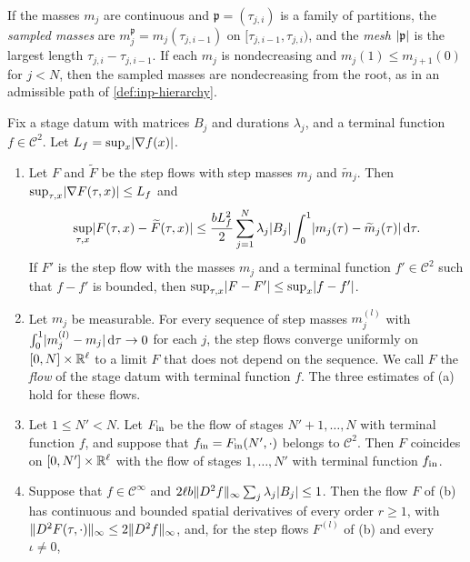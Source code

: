 If the masses $m_j$ are continuous and $\mathfrak p=(\tau_{j,i})$ is a family of
partitions, the \emph{sampled masses} are $m_j^{\mathfrak p}=m_j(\tau_{j,i-1})$
on $[\tau_{j,i-1},\tau_{j,i})$, and the \emph{mesh} $\lvert \mathfrak p\rvert$ is the
largest length $\tau_{j,i}-\tau_{j,i-1}$. If each $m_j$ is nondecreasing and
$m_j(1)\le m_{j+1}(0)$ for $j<N$, then the sampled masses are nondecreasing from
the root, as in an admissible path of \cref{def:inp-hierarchy}.

\begin{lemma}\label{lem:flow-step-limit}
Fix a stage datum with matrices $B_j$ and durations $\lambda_j$, and a terminal
function $f\in\mathcal C^2$. Let $L_f=\sup_x\lvert \nabla f(x)\rvert$.
\begin{enumerate}[label=\textup{(\alph*)}]
\item Let $F$ and $\widetilde F$ be the step flows with step masses $m_j$ and
 $\widetilde m_j$. Then $\sup_{\tau,x}\lvert \nabla F(\tau,x)\rvert\le L_f$ and
 \begin{equation}\label{eq:flow-L1}
  \sup_{\tau,x}\lvert F(\tau,x)-\widetilde F(\tau,x)\rvert
  \le\frac{bL_f^2}{2}\sum_{j=1}^N\lambda_j\lvert B_j\rvert
  \int_0^1\lvert m_j(\tau)-\widetilde m_j(\tau)\rvert\,\mathrm d\tau.
 \end{equation}
 If $F'$ is the step flow with the masses $m_j$ and a terminal function
 $f'\in\mathcal C^2$ such that $f-f'$ is bounded, then
 $\sup_{\tau,x}\lvert F-F'\rvert\le\sup_x\lvert f-f'\rvert$.
\item Let $m_j$ be measurable. For every sequence of step masses $m_j^{(l)}$ with
 $\int_0^1\lvert m_j^{(l)}-m_j\rvert\,\mathrm d\tau\to0$ for each $j$, the step flows converge
 uniformly on $[0,N]\times\mathbb R^\ell$ to a limit $F$ that does not depend on the
 sequence. We call $F$ the \emph{flow} of the stage datum with terminal
 function $f$. The three estimates of \textup{(a)} hold for these flows.
\item Let $1\le N'<N$. Let $F_{\rm in}$ be the flow of stages $N'+1,\dots,N$
 with terminal function $f$, and suppose that $f_{\rm in}=F_{\rm in}(N',\cdot)$
 belongs to $\mathcal C^2$. Then $F$ coincides on $[0,N']\times\mathbb R^\ell$ with the
 flow of stages $1,\dots,N'$ with terminal function $f_{\rm in}$.
\item Suppose that $f\in\mathcal C^\infty$ and
 $2\ell b\lVert D^2f\rVert_\infty\sum_j\lambda_j\lvert B_j\rvert\le1$. Then the flow $F$ of
 \textup{(b)} has continuous and bounded spatial derivatives of every order
 $r\ge1$, with $\lVert D^2F(\tau,\cdot)\rVert_\infty\le2\lVert D^2f\rVert_\infty$, and, for
 the step flows $F^{(l)}$ of \textup{(b)} and every $\iota\ne0$,

\end{enumerate}
\end{lemma}
